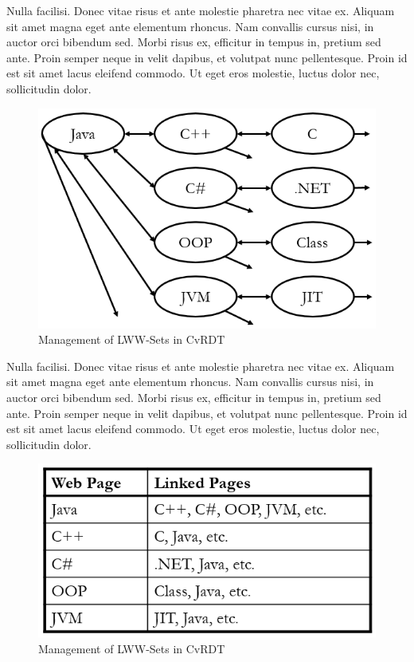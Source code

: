 \documentclass[sigconf,nonacm]{acmart}
\begin{document}
Nulla facilisi. Donec vitae risus et ante molestie pharetra nec vitae ex. Aliquam sit amet magna eget ante elementum rhoncus. Nam convallis cursus nisi, in auctor orci bibendum sed. Morbi risus ex, efficitur in tempus in, pretium sed ante. Proin semper neque in velit dapibus, et volutpat nunc pellentesque. Proin id est sit amet lacus eleifend commodo. Ut eget eros molestie, luctus dolor nec, sollicitudin dolor.

\begin{figure}[h]
  \centering
  \includegraphics[width=\linewidth]{Fig7Wiki1}
  \caption{Management of LWW-Sets in CvRDT}
  \label{fig:wiki1}
\end{figure}

Nulla facilisi. Donec vitae risus et ante molestie pharetra nec vitae ex. Aliquam sit amet magna eget ante elementum rhoncus. Nam convallis cursus nisi, in auctor orci bibendum sed. Morbi risus ex, efficitur in tempus in, pretium sed ante. Proin semper neque in velit dapibus, et volutpat nunc pellentesque. Proin id est sit amet lacus eleifend commodo. Ut eget eros molestie, luctus dolor nec, sollicitudin dolor.

\begin{figure}[h]
  \centering
  \includegraphics[width=\linewidth]{Fig8Wiki2}
  \caption{Management of LWW-Sets in CvRDT}
  \label{fig:wiki2}
\end{figure}
\end{document}
